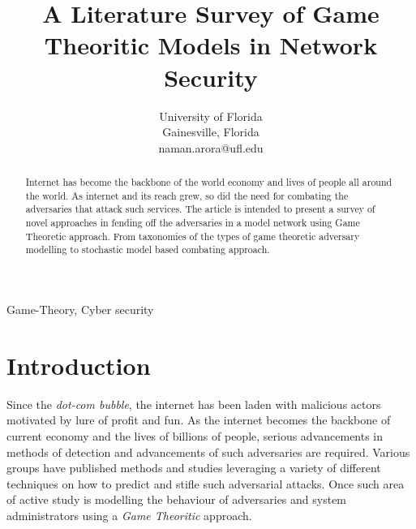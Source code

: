 \documentclass[conference]{IEEEtran}
\begin{document}
\title{A Literature Survey of Game Theoritic Models in Network Security}

\author{
        University of Florida\\
        Gainesville, Florida \\
        naman.arora@ufl.edu
        }

\maketitle

\begin{abstract}
        Internet has become the backbone of the world economy and lives of people all around the world.
        As internet and its reach grew, so did the need for combating the adversaries that attack such services.
        The article is intended to present a survey of novel approaches in fending off the adversaries in a model network using Game Theoretic approach.
        From taxonomies of the types of game theoretic adversary modelling to stochastic model based combating approach.
\end{abstract}

\begin{IEEEkeywords}
        Game-Theory, Cyber security
\end{IEEEkeywords}

\section{Introduction}
Since the \textit{dot-com bubble}, the internet has been laden with malicious actors motivated by lure of profit and fun.
As the internet becomes the backbone of current economy and the lives of billions of people, serious advancements in methods of detection and advancements of such adversaries are required.
Various groups have published methods and studies leveraging a variety of different techniques on how to predict and stifle such adversarial attacks.
Once such area of active study is modelling the behaviour of adversaries and system administrators using a \textit{Game Theoritic} approach.





\end{document}

